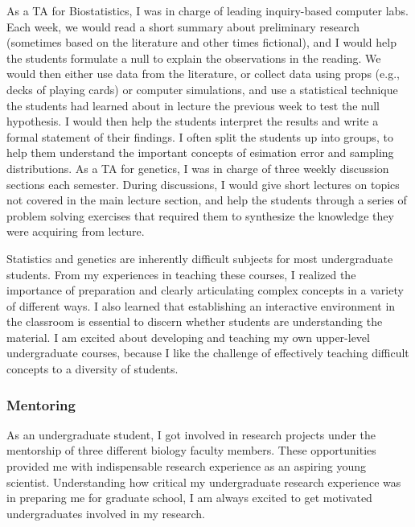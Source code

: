 \documentclass[10pt]{article}
\begin{document}
As a TA for Biostatistics, I was in charge of leading inquiry-based computer labs.
Each week, we would read a short summary about preliminary research (sometimes based on the literature and other times fictional), and I would help the students formulate a null to explain the observations in the reading.
We would then either use data from the literature, or collect data using props (e.g., decks of playing cards) or computer simulations, and use a statistical technique the students had learned about in lecture the previous week to test the null hypothesis.
I would then help the students interpret the results and write a formal statement of their findings.
I often split the students up into groups, to help them understand the important concepts of esimation error and sampling distributions.
As a TA for genetics, I was in charge of three weekly discussion sections each semester.
During discussions, I would give short lectures on topics not covered in the main lecture section, and help the students through a series of problem solving exercises that required them to synthesize the knowledge they were acquiring from lecture.

Statistics and genetics are inherently difficult subjects for most undergraduate students.
From my experiences in teaching these courses, I realized the importance of preparation and clearly articulating complex concepts in a variety of different ways.
I also learned that establishing an interactive environment in the classroom is essential to discern whether students are understanding the material.
I am excited about developing and teaching my own upper-level undergraduate courses, because I like the challenge of effectively teaching difficult concepts to a diversity of students.

\subsubsection*{Mentoring}
As an undergraduate student, I got involved in research projects under the mentorship of three different biology faculty members.
These opportunities provided me with indispensable research experience as an aspiring young scientist.
Understanding how critical my undergraduate research experience was in preparing me for graduate school, I am always excited to get motivated undergraduates involved in my research.
\end{document}
